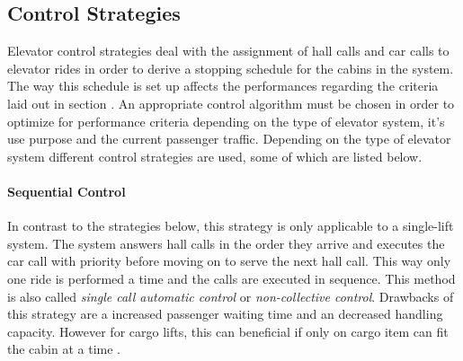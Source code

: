 

\subsection{Control Strategies}
\label{sec:sota:strategies}

Elevator control strategies deal with the assignment of hall calls and car calls to elevator rides in order to derive a stopping schedule for the cabins in the system.
The way this schedule is set up affects
the performances regarding the criteria laid out in section \label{sota:sec:perf}.
An appropriate control algorithm must be chosen in order to optimize for performance criteria
depending on the type of elevator system, it's use purpose and the current passenger traffic.
Depending on the type of elevator system different control strategies are used, some of which are listed below.

\paragraph{Sequential Control}
In contrast to the strategies below, 
this strategy is only applicable to a single-lift system.
The system answers hall calls in the order they arrive 
and executes the car call with priority before moving on to serve the next hall call.
This way only one ride is performed a time and the calls are executed in sequence. This method is also called \emph{single call automatic control} or \emph{non-collective control}.
Drawbacks of this strategy are a increased passenger waiting time and an decreased handling capacity.
However for cargo lifts, this can beneficial if only on cargo item can fit the cabin at a time
\autocite[][p.~238]{barney2016handbook}.

